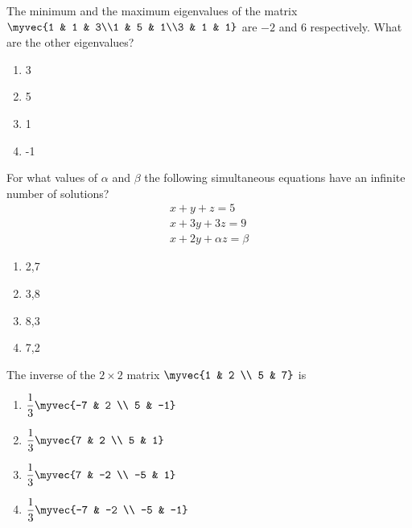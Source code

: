 \item  The minimum and the maximum eigenvalues of the matrix $\myvec{1 & 1 & 3\\1 & 5 & 1\\3 & 1 & 1}$ are $-2$ and $6$ respectively. What are the other eigenvalues?
\hfill{}
\begin{multicols}{4}
\begin{enumerate}    
\item 3
\item 5
\item 1
\item -1
\end{enumerate}
\end{multicols}
\item For what values of $\alpha$ and $\beta$ the following simultaneous equations have an infinite number of solutions?
\hfill{}
	\begin{align*}
x+y+z=5\\  x+3y+3z=9\\  x+2y+\alpha z=\beta
\end{align*}
\begin{multicols}{4}
\begin{enumerate}    
\item 2,7
\item 3,8
\item 8,3
\item 7,2
\end{enumerate}
\end{multicols}
\item The inverse of the $2 \times 2$ matrix $\myvec{1 & 2 \\ 5 & 7}$ is
\hfill{}
\begin{multicols}{4}
\begin{enumerate}    
\item $\dfrac{1}{3}\myvec{-7 & 2 \\ 5 & -1}$
\item $\dfrac{1}{3}\myvec{7 & 2 \\ 5 & 1}$
\item $\dfrac{1}{3}\myvec{7 & -2 \\ -5 & 1}$
\item $\dfrac{1}{3}\myvec{-7 & -2 \\ -5 & -1}$
\end{enumerate}
\end{multicols}

